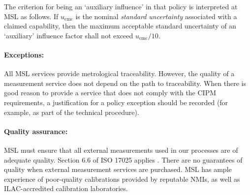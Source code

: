 {The criterion for being an `auxiliary influence' in that policy is interpreted at MSL as follows. If $u_\mathrm{cmc}$ is the nominal \textit{standard uncertainty} associated with a claimed capability, then the maximum acceptable standard uncertainty of an `auxiliary' influence factor shall not exceed $u_\mathrm{cmc} / 10$. 

\paragraph{Exceptions:}  
All MSL services provide metrological traceability. However, the quality of a measurement service does not depend on the path to traceability. When there is good reason to provide a service that does not comply with the CIPM requirements, a justification for a policy exception should be recorded (for example, as part of the technical procedure). 



\paragraph{Quality assurance:}
MSL must ensure that all external measurements used in our processes are of adequate quality. Section 6.6 of ISO 17025 applies \cite{ISO_17025}. There are no guarantees of quality when external measurement services are purchased. MSL has ample experience of poor-quality calibrations provided by reputable NMIs, as well as ILAC-accredited calibration laboratories. 
  
}

